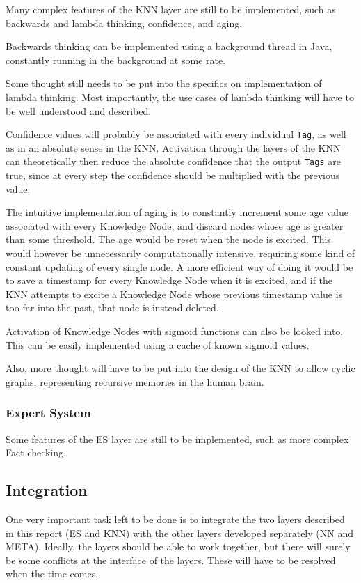 \documentclass[titlepage,11pt]{article}
\newcommand{\code}[1]{\texttt{#1}}
\begin{document}
Many complex features of the KNN layer are still to be implemented, such as backwards and lambda thinking, confidence, and aging.

Backwards thinking can be implemented using a background thread in Java, constantly running in the background at some rate.

Some thought still needs to be put into the specifics on implementation of lambda thinking. Most importantly, the use cases of lambda thinking will have to be well understood and described.

Confidence values will probably be associated with every individual \code{Tag}, as well as in an absolute sense in the KNN. Activation through the layers of the KNN can theoretically then reduce the absolute confidence that the output \code{Tags} are true, since at every step the confidence should be multiplied with the previous value.

The intuitive implementation of aging is to constantly increment some age value associated with every Knowledge Node, and discard nodes whose age is greater than some threshold. The age would be reset when the node is excited. This would however be unnecessarily computationally intensive, requiring some kind of constant updating of every single node. A more efficient way of doing it would be to save a timestamp for every Knowledge Node when it is excited, and if the KNN attempts to excite a Knowledge Node whose previous timestamp value is too far into the past, that node is instead deleted.

Activation of Knowledge Nodes with sigmoid functions can also be looked into. This can be easily implemented using a cache of known sigmoid values.

Also, more thought will have to be put into the design of the KNN to allow cyclic graphs, representing recursive memories in the human brain.

\subsubsection{Expert System}

Some features of the ES layer are still to be implemented, such as more complex Fact checking.

\subsection{Integration}

One very important task left to be done is to integrate the two layers described in this report (ES and KNN) with the other layers developed separately (NN and META). Ideally, the layers should be able to work together, but there will surely be some conflicts at the interface of the layers. These will have to be resolved when the time comes.
\end{document}
